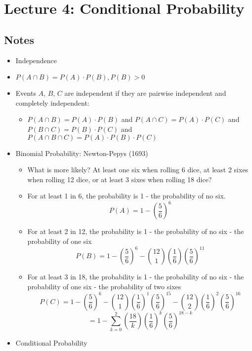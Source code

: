 \documentclass[11pt, oneside]{article}   	%
\begin{document}
\section{Lecture 4: Conditional Probability}
	\subsection{Notes}
		\begin{itemize}
			\item Independence
			\item $P(A \cap B) = P(A) \cdot P(B), P(B) > 0$
			\item Events $A$, $B$, $C$ are independent if they are pairwise independent and completely independent:
				\begin{itemize}
					\item $P(A \cap B) = P(A) \cdot P(B)$ and $P(A \cap C) = P(A) \cdot P(C)$ and $P(B \cap C) = P(B) \cdot P(C)$ and $P(A \cap B \cap C) = P(A) \cdot P(B) \cdot P(C)$
				\end{itemize}
			\item Binomial Probability: Newton-Pepys (1693)
				\begin{itemize}
					\item What is more likely? At least one six when rolling 6 dice, at least 2 sixes when rolling 12 dice, or at least 3 sixes when rolling 18 dice?
					\item For at least 1 in 6, the probability is 1 - the probability of no six.
						\[
							P(A) = 1 - \left( \frac{5}{6} \right)^{6}
						\] 
					\item For at least 2 in 12, the probability is 1 - the probability of no six - the probability of one six
						\[
							P(B) = 1 - \left( \frac{5}{6} \right)^{6} - \binom{12}{1}\left(\frac{1}{6}\right)\left(\frac{5}{6}\right)^{11}
						\]
					\item For at least 3 in 18, the probability is 1 - the probability of no six - the probability of one six - the probability of two sixes
						\[
							P(C) = 1 - \left(\frac{5}{6}\right)^{6} - \binom{12}{1}\left(\frac{1}{6}\right)^{1}\left(\frac{5}{6}\right)^{15}  - \binom{12}{2}\left(\frac{1}{6}\right)^{2}\left(\frac{5}{6}\right)^{16}
						\]
						\[
							 = 1 - \sum_{k=0}^{2} \left(\frac{18}{k}\right) \left(\frac{1}{6}\right)^{k} \left(\frac{5}{6}\right)^{18-k}
						\]
				\end{itemize}
			\item Conditional Probability
				\begin{itemize}

\end{itemize}
\end{itemize}
\end{document}
